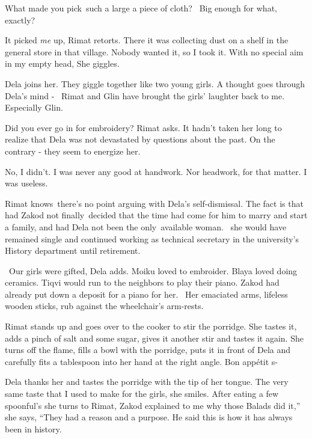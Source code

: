 \documentclass[letterpaper]{article}
\begin{document}
{\textquotedbl}What made you pick~such a large a piece of cloth? \ Big enough for what, exactly?{\textquotedbl}

{\textquotedbl}It picked \textit{me} up,{\textquotedbl} Rimat retorts. {\textquotedbl}There it was collecting dust on a
shelf in the general store in that village. Nobody wanted it, so I took it. With no special aim in my empty
head,{\textquotedbl} She giggles.

Dela joins her. They giggle together like two young girls. A thought goes through Dela's mind - \ Rimat and Glin have
brought the girls' laughter back to me. Especially Glin. 

{\textquotedbl}Did you ever go in for embroidery?{\textquotedbl} Rimat asks. It hadn't taken her long to realize that
Dela was not devastated by questions about the past. On the contrary - they seem to energize her. 

{\textquotedbl}No, I didn't. I was never any good at handwork. Nor headwork, for that matter. I was
useless.{\textquotedbl} 

Rimat knows~there's no point arguing with Dela's self-dismissal. The fact is that had Zakod not finally~decided that the
time had come for him to marry and start a family, and had Dela not been the only~available woman. \ she would have
remained single and continued working as technical secretary in the university's History department until retirement.

~{\textquotedbl}Our girls were gifted,{\textquotedbl} Dela adds. {\textquotedbl}Moiku loved to embroider. Blaya loved
doing ceramics. Tiqvi would run to the neighbors to play their piano. Zakod had already put down a deposit for a piano
for her.{\textquotedbl} \ Her emaciated arms, lifeless wooden sticks, rub against the wheelchair's arm-rests. 

Rimat stands up and goes over to the cooker to stir the porridge. She tastes it, adds a pinch of salt and some sugar,
gives it another stir and tastes it again. She turns off the flame, fills a bowl with the porridge, puts it in front of
Dela and carefully fits a tablespoon into her hand at the right angle. {\textquotedbl}Bon app\'etit s-{\textquotedbl} 

Dela thanks her and tastes the porridge with the tip of her tongue. {\textquotedbl}The very same taste that I used to
make for the girls,{\textquotedbl} she smiles. After eating a few spoonful's she turns to Rimat, {\textquotedbl}Zakod
explained to me why those Balads did it,'' she says, ``They had a reason and a purpose. He said this is how it has
always been in history.{\textquotedbl} 
\end{document}
